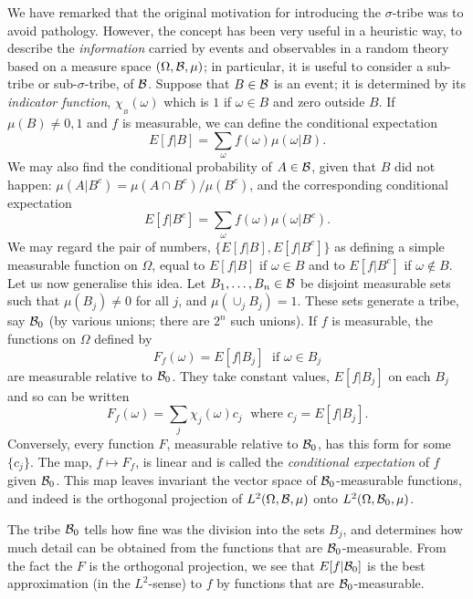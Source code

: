 We have remarked that the original motivation for introducing the
$\sigma$-tribe was to avoid pathology. However, the concept has been very
useful in a heuristic way, to describe the {\em information}
carried by events and observables
in a random theory based on a measure space $(\Omega,{\cal B},\mu)$;
in particular, it is useful to consider a sub-tribe
or sub-$\sigma$-tribe, of ${\cal B}$. Suppose that $B\in{\cal B}$ is an
event; it is determined by its {\em indicator function}, $\chi_{_B}(\omega)$
which is $1$ if $\omega\in B$ and zero outside $B$. If $\mu(B)\neq 0,1$
and $f$ is measurable, we can define the conditional expectation
\begin{equation}
E[f|B]=\sum_\omega f(\omega)\mu(\omega|B).
\end{equation}
We may also find the conditional probability of $A\in{\cal B}$, given
that $B$ did not happen: $\mu(A|B^c)=\mu(A\cap B^c)/\mu(B^c)$, and the
corresponding conditional expectation
\begin{equation}
E[f|B^c]=\sum_\omega f(\omega)\mu(\omega|B^c).
\end{equation}
We may regard the pair of numbers, $\{E[f|B],E[f|B^c]\}$ as defining
a simple measurable function on $\Omega$, equal to $E[f|B]$ if
$\omega\in B$ and to $E[f|B^c]$ if $\omega\notin B$. Let us now
generalise this idea. Let $B_1,\ldots,B_n\in{\cal B}$ be
disjoint measurable sets such that $\mu(B_j)\neq 0$ for all $j$, and
$\mu(\cup_j B_j)=1$. These sets generate a tribe, say ${\cal B}_0$
(by various unions; there are $2^n$ such unions). If $f$ is measurable,
the functions on $\Omega$ defined by
\begin{equation}
F_f(\omega)=E[f|B_j]\;\mbox{ if }\omega\in B_j
\end{equation}
are measurable relative to ${\cal B}_0$. They take constant values,
$E[f|B_j]$ on each $B_j$ and so can be written
\begin{equation}
F_f(\omega)=\sum_j\chi_j(\omega)c_j\;\mbox{ where }c_j=E[f|B_j].
\end{equation}
Conversely, every function $F$, measurable relative to ${\cal B}_0$,
has this form for some $\{c_j\}$. The map, $f\mapsto F_f$, is linear
and is called the {\em conditional expectation} of $f$ given
${\cal B}_0$. This map leaves invariant the
vector space of ${\cal B}_0$-measurable functions, and indeed
is the orthogonal projection of $L^2(\Omega,{\cal B},\mu)$ onto
$L^2(\Omega,{\cal B}_0,\mu)$.

The tribe ${\cal B}_0$ tells how
fine was the division into the sets $B_j$, and determines how
much detail can be obtained from the functions that are
${\cal B}_0$-measurable. From the fact the $F$ is the orthogonal projection,
we see that $E[f|{\cal B}_0]$ is the best approximation (in the $L^2$-sense)
to $f$ by functions that are ${\cal B}_0$-measurable.

